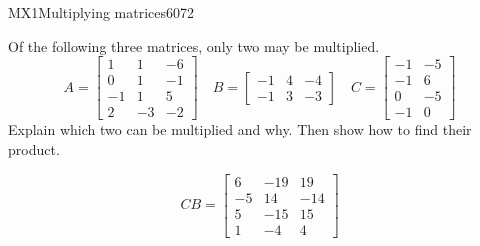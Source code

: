 \begin{exercise}{MX1}{Multiplying matrices}{6072} 
\begin{exerciseStatement} 

Of the following three matrices, only two may be multiplied. \[
          A=\left[\begin{array}{ccc}
1 & 1 & -6 \\
0 & 1 & -1 \\
-1 & 1 & 5 \\
2 & -3 & -2
\end{array}\right] \hspace{1em} B=\left[\begin{array}{ccc}
-1 & 4 & -4 \\
-1 & 3 & -3
\end{array}\right] \hspace{1em} C=\left[\begin{array}{cc}
-1 & -5 \\
-1 & 6 \\
0 & -5 \\
-1 & 0
\end{array}\right]
      \] Explain which two can be multiplied and why. Then show how to find their product.

 \end{exerciseStatement}
 \begin{exerciseAnswer} \[CB=\left[\begin{array}{ccc}
6 & -19 & 19 \\
-5 & 14 & -14 \\
5 & -15 & 15 \\
1 & -4 & 4
\end{array}\right]\] \end{exerciseAnswer}
 \end{exercise}


